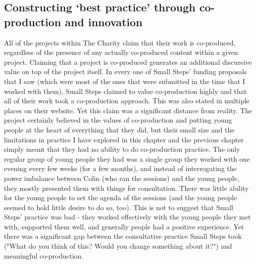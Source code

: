 \subsection{Constructing `best practice' through co-production and innovation}
All of the projects within The Charity claim that their work is co-produced, regardless of the presence of any actually co-produced content within a given project. Claiming that a project is co-produced generates an additional discursive value on top of the project itself. In every one of Small Steps' funding proposals that I saw (which were most of the ones that were submitted in the time that I worked with them), Small Steps claimed to value co-production highly and that all of their work took a co-production approach. This was also stated in multiple places on their website. Yet this claim was a significant distance from reality. The project certainly believed in the values of co-production and putting young people at the heart of everything that they did, but their small size and the limitations in practice I have explored in this chapter and the previous chapter simply meant that they had no ability to do co-production practice. The only regular group of young people they had was a single group they worked with one evening every few weeks (for a few months), and instead of interrogating the power imbalance between Colin (who ran the sessions) and the young people, they mostly presented them with things for consultation. There was little ability for the young people to set the agenda of the sessions (and the young people seemed to hold little desire to do so, too). This is not to suggest that Small Steps' practice was bad - they worked effectively with the young people they met with, supported them well, and generally people had a positive experience. Yet there was a significant gap between the consultative practice Small Steps took ("What do you think of this? Would you change something about it?") and meaningful co-production.

